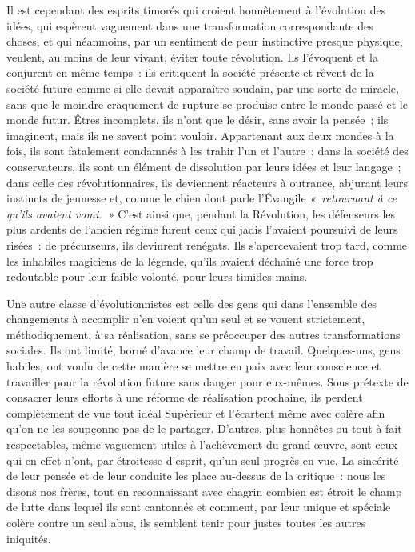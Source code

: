 \documentclass[french,twoside]{book} %
\begin{document}
 Il est cependant des esprits timorés qui croient honnêtement à l’évolution des idées, qui espèrent vaguement dans une transformation correspondante des choses, et qui néanmoins, par un sentiment de peur instinctive presque physique, veulent, au moins de leur vivant, éviter toute révolution. Ils l’évoquent et la conjurent en même temps : ils critiquent la société présente et rêvent de la société future comme si elle devait apparaître soudain, par une sorte de miracle, sans que le moindre craquement de rupture se produise entre le monde passé et le monde futur. Êtres incomplets, ils n’ont que le désir, sans avoir la pensée ; ils imaginent, mais ils ne savent point vouloir. Appartenant aux deux mondes à la fois, ils sont fatalement  condamnés à les trahir l’un et l’autre : dans la société des conservateurs, ils sont un élément de dissolution par leurs idées et leur langage ; dans celle des révolutionnaires, ils deviennent réacteurs à outrance, abjurant leurs instincts de jeunesse et, comme le chien dont parle l’Évangile \emph{« retournant à ce qu’ils avaient vomi. »} C’est ainsi que, pendant la Révolution, les défenseurs les plus ardents de l’ancien régime furent ceux qui jadis l’avaient poursuivi de leurs risées : de précurseurs, ils devinrent renégats. Ils s’apercevaient trop tard, comme les inhabiles magiciens de la légende, qu’ils avaient déchaîné une force trop redoutable pour leur faible volonté, pour leurs timides mains.\par
Une autre classe d’évolutionnistes est  celle des gens qui dans l’ensemble des changements à accomplir n’en voient qu’un seul et se vouent strictement, méthodiquement, à sa réalisation, sans se préoccuper des autres transformations sociales. Ils ont limité, borné d’avance leur champ de travail. Quelques-uns, gens habiles, ont voulu de cette manière se mettre en paix avec leur conscience et travailler pour la révolution future sans danger pour eux-mêmes. Sous prétexte de consacrer leurs efforts à une réforme de réalisation prochaine, ils perdent complètement de vue tout idéal Supérieur et l’écartent même avec colère afin qu’on ne les soupçonne pas de le partager. D’autres, plus honnêtes ou tout à fait respectables, même vaguement utiles à l’achèvement du grand  œuvre, sont ceux qui en effet n’ont, par étroitesse d’esprit, qu’un seul progrès en vue. La sincérité de leur pensée et de leur conduite les place au-dessus de la critique : nous les disons nos frères, tout en reconnaissant avec chagrin combien est étroit le champ de lutte dans lequel ils sont cantonnés et comment, par leur unique et spéciale colère contre un seul abus, ils semblent tenir pour justes toutes les autres iniquités.\par
\end{document}

